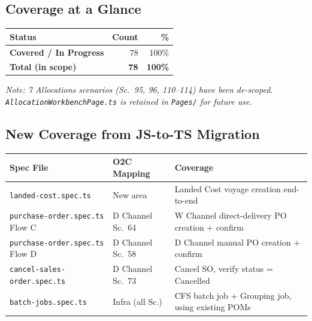 \documentclass[a4paper,11pt]{article}
\begin{document}
\subsection{Coverage at a Glance}

\begin{tcolorbox}[colback=lightBlue,colframe=statusBlue!70!black,title=\textbf{O2C Regression Coverage --- 78 In-Scope Scenarios}]
\begin{tabular}{lrr}
\textbf{Status} & \textbf{Count} & \textbf{\%} \\
\hline
\textcolor{statusGreen}{\textbf{Covered / In Progress}} & 78 & 100\% \\
\hline
\textbf{Total (in scope)} & \textbf{78} & \textbf{100\%} \\
\end{tabular}
\vspace{0.4em}

\noindent\textit{Note: 7 Allocations scenarios (Sc.\ 95, 96, 110--114) have been de-scoped. \texttt{AllocationWorkbenchPage.ts} is retained in \texttt{Pages/} for future use.}
\end{tcolorbox}

\subsection{New Coverage from JS-to-TS Migration}

\begin{tcolorbox}[colback=lightGreen,colframe=statusGreen!70!black,title=\textbf{Smoke Tests Converted and Integrated}]
\renewcommand{\arraystretch}{1.25}
\begin{tabular}{p{} p{} p{}}
\textbf{Spec File} & \textbf{O2C Mapping} & \textbf{Coverage} \\
\hline
\texttt{landed-cost.spec.ts} & New area & Landed Cost voyage creation end-to-end \\
\texttt{purchase-order.spec.ts} Flow C & D Channel Sc.\ 64 & W Channel direct-delivery PO creation + confirm \\
\texttt{purchase-order.spec.ts} Flow D & D Channel Sc.\ 58 & D Channel manual PO creation + confirm \\
\texttt{cancel-sales-order.spec.ts} & D Channel Sc.\ 73 & Cancel SO, verify status = Cancelled \\
\texttt{batch-jobs.spec.ts} & Infra (all Sc.) & CFS batch job + Grouping job, using existing POMs \\
\end{tabular}
\end{tcolorbox}
\end{document}
